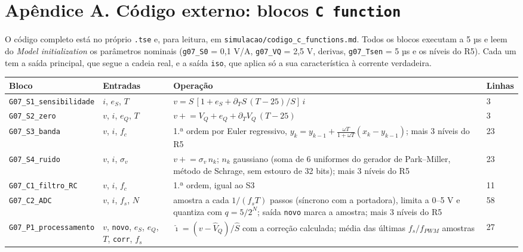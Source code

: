 \documentclass[10pt,a4paper]{article}
\begin{document}
\section*{Apêndice A. Código externo: blocos \texttt{C function}}
O código completo está no próprio \texttt{.tse} e, para leitura, em \texttt{simulacao/codigo\_c\_functions.md}. Todos os blocos executam a 5 µs e leem do \emph{Model initialization} os parâmetros nominais (\texttt{g07\_S0} = 0,1 V/A, \texttt{g07\_VQ} = 2,5 V, derivas, \texttt{g07\_Tsen} = 5 µs e os níveis do R5). Cada um tem a saída principal, que segue a cadeia real, e a saída \texttt{iso}, que aplica só a sua característica à corrente verdadeira.
\begin{table}[!htbp]\centering\footnotesize
\begin{tabularx}{\textwidth}{p{2.9cm}p{2.6cm}Yp{0.8cm}}\toprule
Bloco & Entradas & Operação & Linhas\\\midrule
\texttt{G07\_S1\_sensibilidade} & $i$, $e_S$, $T$ & $v = S\,[1+e_S+\partial_TS\,(T-25)/S]\,i$ & 3\\
\texttt{G07\_S2\_zero} & $v$, $i$, $e_Q$, $T$ & $v \mathrel{+}= V_Q + e_Q + \partial_TV_Q\,(T-25)$ & 3\\
\texttt{G07\_S3\_banda} & $v$, $i$, $f_c$ & 1.ª ordem por Euler regressivo, $y_k = y_{k-1} + \frac{\omega T}{1+\omega T}(x_k-y_{k-1})$; mais 3 níveis do R5 & 23\\
\texttt{G07\_S4\_ruido} & $v$, $i$, $\sigma_v$ & $v \mathrel{+}= \sigma_v\,n_k$; $n_k$ gaussiano (soma de 6 uniformes do gerador de Park–Miller, método de Schrage, sem estouro de 32 bits); mais 3 níveis do R5 & 23\\
\texttt{G07\_C1\_filtro\_RC} & $v$, $i$, $f_c$ & 1.ª ordem, igual ao S3 & 11\\
\texttt{G07\_C2\_ADC} & $v$, $i$, $f_s$, $N$ & amostra a cada $1/(f_s T)$ passos (síncrono com a portadora), limita a 0–5 V e quantiza com $q = 5/2^N$; saída \texttt{novo} marca a amostra; mais 3 níveis do R5 & 58\\
\texttt{G07\_P1\_processamento} & $v$, \texttt{novo}, $e_S$, $e_Q$, $T$, \texttt{corr}, $f_s$ & $\hat\imath = (v-\hat V_Q)/\hat S$ com a correção calculada; média das últimas $f_s/f_{PWM}$ amostras & 27\\\bottomrule
\end{tabularx}
\end{table}
\end{document}
